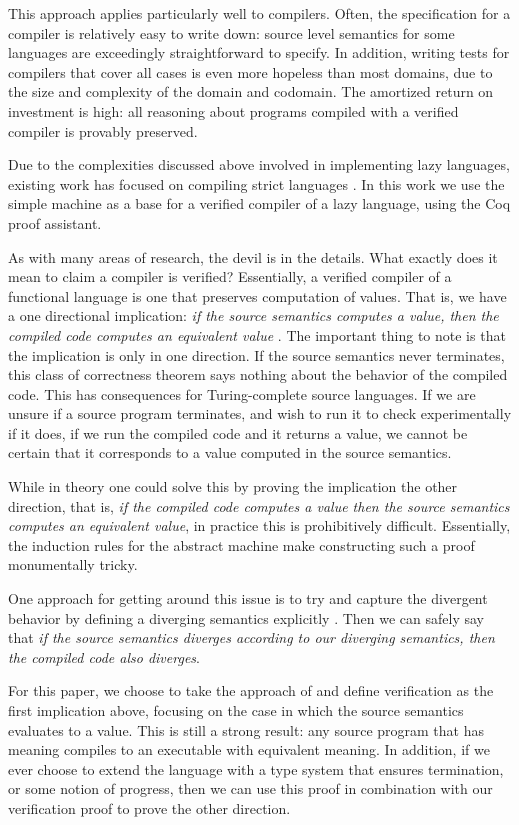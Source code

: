This approach applies particularly well to compilers. Often, the specification
for a compiler is relatively easy to write down: source level semantics for some
languages are exceedingly straightforward to specify. In addition, writing tests 
for compilers that cover all cases is even more hopeless than most domains, due
to the size and complexity of the domain and codomain. The amortized return on
investment is high: all reasoning about programs compiled with a verified
compiler is provably preserved. 

Due to the complexities discussed above involved in implementing lazy languages,
existing work has focused on compiling strict languages
\cite{chlipala2007certified, leroy2012compcert, cakeml14}. In this work we use
the simple \ce machine as a base for a verified compiler of a lazy
language, using the Coq proof assistant. 

As with many areas of research, the devil is in the details. What exactly does
it mean to claim a compiler is verified?  Essentially, a verified compiler of a
functional language is one that preserves computation of values. That is, we
have a one directional implication: \emph{if the source semantics computes a
value, then the compiled code computes an equivalent value}
\cite{chlipala2007certified}. The important thing to note is that the
implication is only in one direction. If the source semantics never terminates,
this class of correctness theorem says nothing about the behavior of the
compiled code. This has consequences for Turing-complete source languages. If we
are unsure if a source program terminates, and wish to run it to check
experimentally if it does, if we run the compiled code and it returns a value,
we cannot be certain that it corresponds to a value computed in the source
semantics. 

While in theory one could solve this by proving the implication the other
direction, that is, \emph{if the compiled code computes a value then the source
semantics computes an equivalent value}, in practice this is prohibitively
difficult. Essentially, the induction rules for the abstract machine make
constructing such a proof monumentally tricky. 

One approach for getting around this issue is to try and capture the divergent
behavior by defining a diverging semantics explicitly \cite{functionalbigstep}.
Then we can safely say that \emph{if the source semantics diverges according to
our diverging semantics, then the compiled code also diverges}. 

For this paper, we choose to take the approach of \cite{chlipala2007certified}
and define verification as the first implication above, focusing on the case in
which the source semantics evaluates to a value. This is still a strong
result: any source program that has meaning compiles to an executable with
equivalent meaning. In addition, if we ever choose to extend the language with a
type system that ensures termination, or some notion of progress, then we can
use this proof in combination with our verification proof to prove the other
direction. 
